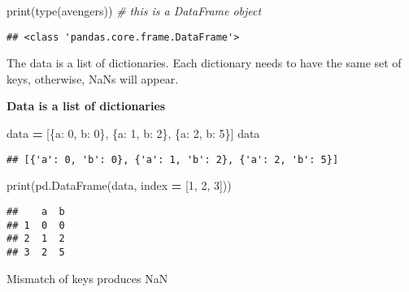 \documentclass[
]{book}
\newenvironment{Shaded}{\begin{snugshade}}{\end{snugshade}}
\newcommand{\BuiltInTok}[1]{#1}
\newcommand{\CommentTok}[1]{\textcolor[rgb]{0.56,0.35,0.01}{\textit{#1}}}
\newcommand{\DecValTok}[1]{\textcolor[rgb]{0.00,0.00,0.81}{#1}}
\newcommand{\NormalTok}[1]{#1}
\newcommand{\OperatorTok}[1]{\textcolor[rgb]{0.81,0.36,0.00}{\textbf{#1}}}
\newcommand{\StringTok}[1]{\textcolor[rgb]{0.31,0.60,0.02}{#1}}
\begin{document}
\begin{Shaded}
\begin{Highlighting}[]
\BuiltInTok{print}\NormalTok{(}\BuiltInTok{type}\NormalTok{(avengers)) }\CommentTok{\# this is a DataFrame object}
\end{Highlighting}
\end{Shaded}

\begin{verbatim}
## <class 'pandas.core.frame.DataFrame'>
\end{verbatim}

The data is a list of dictionaries. Each dictionary needs to have the same set of keys,
otherwise, NaNs will appear.

\textbf{Data is a list of dictionaries}

\begin{Shaded}
\begin{Highlighting}[]
\NormalTok{data }\OperatorTok{=}\NormalTok{ [\{}\StringTok{\textquotesingle{}a\textquotesingle{}}\NormalTok{: }\DecValTok{0}\NormalTok{, }\StringTok{\textquotesingle{}b\textquotesingle{}}\NormalTok{: }\DecValTok{0}\NormalTok{\},}
\NormalTok{\{}\StringTok{\textquotesingle{}a\textquotesingle{}}\NormalTok{: }\DecValTok{1}\NormalTok{, }\StringTok{\textquotesingle{}b\textquotesingle{}}\NormalTok{: }\DecValTok{2}\NormalTok{\},}
\NormalTok{\{}\StringTok{\textquotesingle{}a\textquotesingle{}}\NormalTok{: }\DecValTok{2}\NormalTok{, }\StringTok{\textquotesingle{}b\textquotesingle{}}\NormalTok{: }\DecValTok{5}\NormalTok{\}]}
\NormalTok{data}
\end{Highlighting}
\end{Shaded}

\begin{verbatim}
## [{'a': 0, 'b': 0}, {'a': 1, 'b': 2}, {'a': 2, 'b': 5}]
\end{verbatim}

\begin{Shaded}
\begin{Highlighting}[]
\BuiltInTok{print}\NormalTok{(pd.DataFrame(data, index }\OperatorTok{=}\NormalTok{ [}\DecValTok{1}\NormalTok{, }\DecValTok{2}\NormalTok{, }\DecValTok{3}\NormalTok{]))}
\end{Highlighting}
\end{Shaded}

\begin{verbatim}
##    a  b
## 1  0  0
## 2  1  2
## 3  2  5
\end{verbatim}

Mismatch of keys produces NaN
\end{document}
